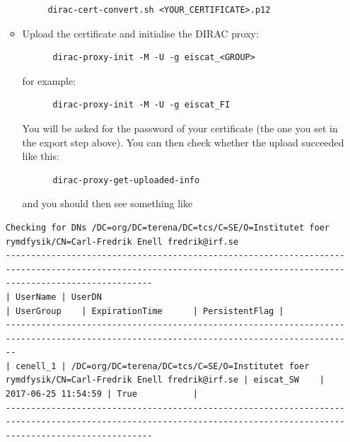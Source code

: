\documentclass[a4paper]{article}
\begin{document}
\begin{enumerate}
\begin{itemize}
    \begin{verbatim}
     dirac-cert-convert.sh <YOUR_CERTIFICATE>.p12
     \end{verbatim}

  \item Upload the certificate and initialise the DIRAC proxy:

\begin{verbatim}
      dirac-proxy-init -M -U -g eiscat_<GROUP>
\end{verbatim}

    for example:
\begin{verbatim}
      dirac-proxy-init -M -U -g eiscat_FI
\end{verbatim}
    
    
    You will be asked for the password of your certificate (the one you set in the export step above).
    You can then check whether the upload succeeded like this:
    \begin{verbatim}
      dirac-proxy-get-uploaded-info 
    \end{verbatim}

    and you should then see something like
  \end{itemize}


\noindent
{\tiny
\begin{verbatim}
Checking for DNs /DC=org/DC=terena/DC=tcs/C=SE/O=Institutet foer rymdfysik/CN=Carl-Fredrik Enell fredrik@irf.se
-------------------------------------------------------------------------------------------------------------------------------------------------------------------
| UserName | UserDN                                                                                         | UserGroup    | ExpirationTime      | PersistentFlag |
----------------------------------------------------------------------------------------------------------------------------------------
| cenell_1 | /DC=org/DC=terena/DC=tcs/C=SE/O=Institutet foer rymdfysik/CN=Carl-Fredrik Enell fredrik@irf.se | eiscat_SW    | 2017-06-25 11:54:59 | True           |
-------------------------------------------------------------------------------------------------------------------------------------------------------------------
\end{verbatim}
}%

\end{enumerate}
\end{document}
